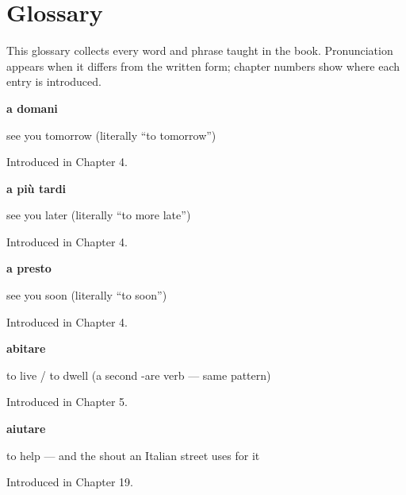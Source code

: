 
\chapter*{Glossary}

This glossary collects every word and phrase taught in the book. Pronunciation appears when it differs from the written form; chapter numbers show where each entry is introduced.

\noindent\begin{minipage}[t]{\linewidth}
\raggedright
\textbf{a domani}\par
\small see you tomorrow (literally \textquotedblleft{}to tomorrow\textquotedblright{})\par
\footnotesize Introduced in Chapter 4.
\end{minipage}\par\medskip

\noindent\begin{minipage}[t]{\linewidth}
\raggedright
\textbf{a più tardi}\par
\small see you later (literally \textquotedblleft{}to more late\textquotedblright{})\par
\footnotesize Introduced in Chapter 4.
\end{minipage}\par\medskip

\noindent\begin{minipage}[t]{\linewidth}
\raggedright
\textbf{a presto}\par
\small see you soon (literally \textquotedblleft{}to soon\textquotedblright{})\par
\footnotesize Introduced in Chapter 4.
\end{minipage}\par\medskip

\noindent\begin{minipage}[t]{\linewidth}
\raggedright
\textbf{abitare}\par
\small to live / to dwell (a second -are verb — same pattern)\par
\footnotesize Introduced in Chapter 5.
\end{minipage}\par\medskip

\noindent\begin{minipage}[t]{\linewidth}
\raggedright
\textbf{aiutare}\par
\small to help — and the shout an Italian street uses for it\par
\footnotesize Introduced in Chapter 19.
\end{minipage}\par\medskip

